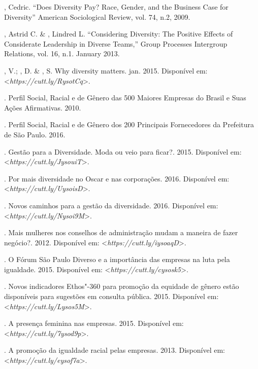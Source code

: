 \begin{Parskip}
, Cedric. ``Does Diversity Pay? Race, Gender, and the Business
Case for Diversity'' American Sociological Review, vol. 74, n.2, 2009.

, Astrid C. \& , Lindred L. ``Considering Diversity: The
Positive Effects of Considerate Leadership in Diverse Teams,'' Group
Processes Intergroup Relations, vol. 16, n.1. January 2013.

, V.; , D. \& , S. Why diversity matters. jan. 2015.
Disponível em: \textless{}\emph{https://cutt.ly/RysotCq}\textgreater{}.

. Perfil Social, Racial e de Gênero
das 500 Maiores Empresas do Brasil e Suas Ações Afirmativas. 2010.

. Perfil Social, Racial e
de Gênero dos 200 Principais Fornecedores da Prefeitura de São Paulo.
2016.

. Gestão para a Diversidade. Moda ou veio para ficar?.
2015.
Disponível em: \textless{}\emph{https://cutt.ly/JysouiT}\textgreater{}.

. Por mais diversidade no Oscar e nas corporações. 2016.
Disponível em: \textless{}\emph{https://cutt.ly/UysoisD}\textgreater{}.

. Novos caminhos para a gestão da diversidade. 2016.
Disponível em: \textless{}\emph{https://cutt.ly/Nysoi9M}\textgreater{}.

. Mais mulheres nos conselhos de administração mudam a
maneira de fazer negócio?. 2012.
Disponível em: \textless{}\emph{https://cutt.ly/iysoaqD}\textgreater{}.

. O Fórum São Paulo Diverso e a importância das empresas
na luta pela igualdade. 2015.
Disponível em: \textless{}\emph{https://cutt.ly/cysosk5}\textgreater{}.

. Novos indicadores Ethos"-360 para promoção da equidade
de gênero estão disponíveis para sugestões em consulta pública. 2015.
Disponível em: \textless{}\emph{https://cutt.ly/Lysos5M}\textgreater{}.

. A presença feminina nas empresas. 2015.
Disponível em: \textless{}\emph{https://cutt.ly/7ysod9p}\textgreater{}.

. A promoção da igualdade racial pelas empresas. 2013.
Disponível em: \textless{}\emph{https://cutt.ly/eysof7a}\textgreater{}.


\end{Parskip}
